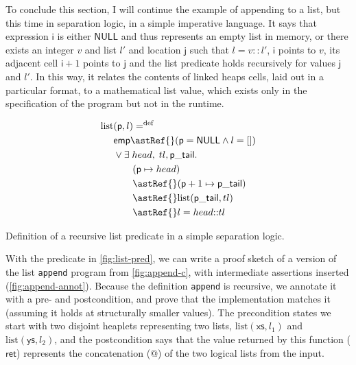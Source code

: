 To conclude this section, I will continue the example of appending to a list,
but this time in separation logic, in a simple imperative language. It says
that expression $\mathsf{i}$ is either $\mathsf{NULL}$ and thus represents an
empty list in memory, or there exists an integer $v$ and list $l'$ and location
$\mathsf{j}$ such that $l = v {:}{:} l'$, $\mathsf{i}$ points to $v$, its
adjacent cell $\mathsf{i}+1$ points to $\mathsf{j}$ and the list predicate
holds recursively for values $\mathsf{j}$ and $l'$. In this way, it relates the
contents of linked heaps cells, laid out in a particular format, to a
mathematical list  value, which exists only in the specification
of the program but not in the runtime.

\begin{marginfigure}
    \centering
    \begin{align*}
        \mathrm{list} &(\mathsf{p}, l) \mathrel{{=}^\mathrm{def}} \\
                      &\mathsf{emp} \astRef{} (\mathsf{p} = \mathsf{NULL} \wedge{} l = []) \\
                      &\vee{} \exists{} \; {head}, \; {tl}, \mathsf{p\_tail}.\\
                      &\qquad (\mathsf{p} \mapsto{} {head}) \\
                      &\qquad \astRef{} (\mathsf{p} + 1 \mapsto{} \mathsf{p\_tail}) \\
                      &\qquad \astRef{} \mathrm{list} (\mathsf{p\_tail}, {tl}) \\
                      &\qquad \astRef{} l = {head} {:}{:} {tl} \\
    \end{align*}
    \caption{Definition of a recursive list predicate in a simple separation
        logic.}\label{fig:list-pred}
\end{marginfigure}

With the predicate in \cref{fig:list-pred}, we can write a proof sketch of a
version of the list \texttt{append} program from \cref{fig:append-c},
with intermediate assertions inserted (\cref{fig:append-annot}). Because the
definition \texttt{append} is recursive, we annotate it with a pre-
and postcondition, and prove that the implementation matches it (assuming it
holds at structurally smaller values). The precondition states we start with
two disjoint heaplets representing two  lists,
$\mathrm{list}(\mathsf{xs}, l_1)$ and $\mathrm{list}(\mathsf{ys}, l_2)$, and
the postcondition says that the value returned by this function
($\mathsf{ret}$) represents the concatenation ($@$) of the two logical lists
from the input.

